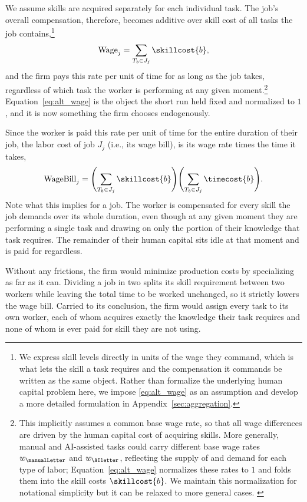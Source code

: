 We assume skills are acquired separately for each individual task. 
The job's overall compensation, therefore, becomes additive over skill cost of all tasks the job contains,\footnote{
We express skill levels directly in units of the wage they command, which is what lets the skill a task requires and the compensation it commands be written as the same object.
Rather than formalize the underlying human capital problem here, we impose \eqref{eq:alt_wage} as an assumption and develop a more detailed formulation in Appendix~\ref{sec:aggregation}.
}
\begin{align}
\label{eq:alt_wage}
\text{Wage}_j = \sum_{T_b \in J_j} \skillcost{b},
\end{align}
and the firm pays this rate per unit of time for as long as the job takes, regardless of which task the worker is performing at any given moment.\footnote{
This implicitly assumes a common base wage rate, so that all wage differences are driven by the human capital cost of acquiring skills.
More generally, manual and AI-assisted tasks could carry different base wage rates $w_{\manualLetter}$ and $w_{\AIletter}$, reflecting the supply of and demand for each type of labor; Equation~\eqref{eq:alt_wage} normalizes these rates to $1$ and folds them into the skill costs $\skillcost{b}$.
We maintain this normalization for notational simplicity but it can be relaxed to more general cases.
\label{foot:alt_wage}
}
Equation~\eqref{eq:alt_wage} is the object the short run held fixed and normalized to $1$, and it is now something the firm chooses endogenously.

Since the worker is paid this rate per unit of time for the entire duration of their job, the labor cost of job $J_j$ (i.e., its wage bill), is its wage rate times the time it takes,
\begin{align}
\label{eq:alt_jobcost}
\text{WageBill}_j = \Biggl(\sum_{T_b \in J_j} \skillcost{b} \Biggr)\Biggl(\sum_{T_b \in J_j} \timecost{b} \Biggr).
\end{align}
Note what this implies for a job.
The worker is compensated for every skill the job demands over its whole duration, even though at any given moment they are performing a single task and drawing on only the portion of their knowledge that task requires.
The remainder of their human capital sits idle at that moment and is paid for regardless.

Without any frictions, the firm would minimize production costs by specializing as far as it can.
Dividing a job in two splits its skill requirement between two workers while leaving the total time to be worked unchanged, so it strictly lowers the wage bill.
Carried to its conclusion, the firm would assign every task to its own worker, each of whom acquires exactly the knowledge their task requires and none of whom is ever paid for skill they are not using.

